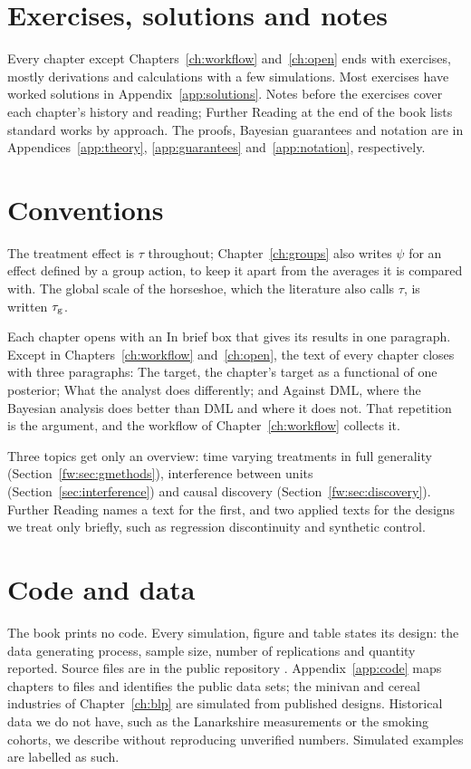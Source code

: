\section*{Exercises, solutions and notes}

Every chapter except Chapters~\ref{ch:workflow} and~\ref{ch:open} ends with exercises, mostly derivations and calculations with a few simulations. Most exercises have worked solutions in Appendix~\ref{app:solutions}. Notes before the exercises cover each chapter's history and reading; Further Reading at the end of the book lists standard works by approach. The proofs, Bayesian guarantees and notation are in Appendices~\ref{app:theory}, \ref{app:guarantees} and~\ref{app:notation}, respectively.

\section*{Conventions}

The treatment effect is $\tau$ throughout; Chapter~\ref{ch:groups} also writes $\psi$ for an effect defined by a group action, to keep it apart from the averages it is compared with. The global scale of the horseshoe, which the literature also calls $\tau$, is written $\tau_{\mathrm{g}}$.

Each chapter opens with an In brief box that gives its results in one paragraph. Except in Chapters~\ref{ch:workflow} and~\ref{ch:open}, the text of every chapter closes with three paragraphs: The target, the chapter's target as a functional of one posterior; What the analyst does differently; and Against DML, where the Bayesian analysis does better than DML and where it does not. That repetition is the argument, and the workflow of Chapter~\ref{ch:workflow} collects it.

Three topics get only an overview: time varying treatments in full generality (Section~\ref{fw:sec:gmethods}), interference between units (Section~\ref{sec:interference}) and causal discovery (Section~\ref{fw:sec:discovery}). Further Reading names a text for the first, and two applied texts for the designs we treat only briefly, such as regression discontinuity and synthetic control.

\section*{Code and data}

The book prints no code. Every simulation, figure and table states its design: the data generating process, sample size, number of replications and quantity reported. Source files are in the public repository \coderepo. Appendix~\ref{app:code} maps chapters to files and identifies the public data sets; the minivan and cereal industries of Chapter~\ref{ch:blp} are simulated from published designs. Historical data we do not have, such as the Lanarkshire measurements or the smoking cohorts, we describe without reproducing unverified numbers. Simulated examples are labelled as such.

